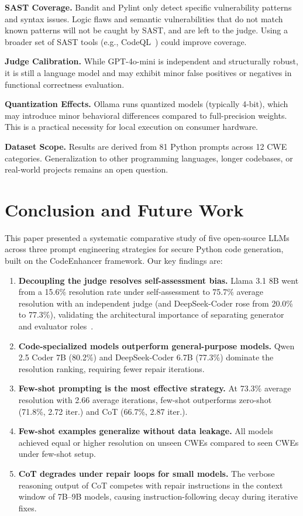 \documentclass[runningheads]{llncs}
\begin{document}
\textbf{SAST Coverage.} Bandit and Pylint only detect specific vulnerability patterns and syntax issues. Logic flaws and semantic vulnerabilities that do not match known patterns will not be caught by SAST, and are left to the judge. Using a broader set of SAST tools (e.g., CodeQL~\cite{github2023codeql}) could improve coverage.

\textbf{Judge Calibration.} While GPT-4o-mini is independent and structurally robust, it is still a language model and may exhibit minor false positives or negatives in functional correctness evaluation.

\textbf{Quantization Effects.} Ollama runs quantized models (typically 4-bit), which may introduce minor behavioral differences compared to full-precision weights. This is a practical necessity for local execution on consumer hardware.

\textbf{Dataset Scope.} Results are derived from 81 Python prompts across 12 CWE categories. Generalization to other programming languages, longer codebases, or real-world projects remains an open question.

\section{Conclusion and Future Work}
\label{sec:conclusion}

This paper presented a systematic comparative study of five open-source LLMs across three prompt engineering strategies for secure Python code generation, built on the CodeEnhancer framework. Our key findings are:

\begin{enumerate}
  \item \textbf{Decoupling the judge resolves self-assessment bias.} Llama 3.1 8B went from a 15.6\% resolution rate under self-assessment to 75.7\% average resolution with an independent judge (and DeepSeek-Coder rose from 20.0\% to 77.3\%), validating the architectural importance of separating generator and evaluator roles~\cite{olausson2024selfrepair}.
  \item \textbf{Code-specialized models outperform general-purpose models.} Qwen 2.5 Coder 7B (80.2\%) and DeepSeek-Coder 6.7B (77.3\%) dominate the resolution ranking, requiring fewer repair iterations.
  \item \textbf{Few-shot prompting is the most effective strategy.} At 73.3\% average resolution with 2.66 average iterations, few-shot outperforms zero-shot (71.8\%, 2.72 iter.) and CoT (66.7\%, 2.87 iter.).
  \item \textbf{Few-shot examples generalize without data leakage.} All models achieved equal or higher resolution on unseen CWEs compared to seen CWEs under few-shot setup.
  \item \textbf{CoT degrades under repair loops for small models.} The verbose reasoning output of CoT competes with repair instructions in the context window of 7B--9B models, causing instruction-following decay during iterative fixes.
\end{enumerate}
\end{document}

